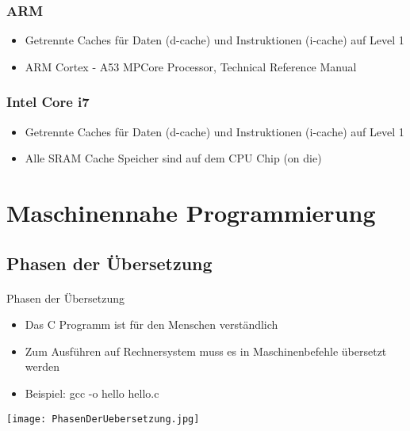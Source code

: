 			\vspace{1cm}
			\begin{minipage}[t]{0.5\textwidth}
				\subsubsection{ARM}
				\begin{itemize}
					\item Getrennte Caches für Daten (d-cache) und Instruktionen (i-cache) auf Level 1
					\item ARM Cortex - A53 MPCore Processor, Technical Reference Manual
				\end{itemize}
			\end{minipage}
			\begin{minipage}[t]{0.45\textwidth}
				\subsubsection{Intel Core i7}
				\begin{itemize}
					\item Getrennte Caches für Daten (d-cache) und Instruktionen (i-cache) auf Level 1
					\item Alle SRAM Cache Speicher sind auf dem CPU Chip (on die)
				\end{itemize}
			\end{minipage}


\newpage
\section{Maschinennahe Programmierung}
	\subsection{Phasen der Übersetzung}
		\paragraph{} Phasen der Übersetzung
		\begin{itemize}
			\item Das C Programm ist für den Menschen verständlich
			\item Zum Ausführen auf Rechnersystem muss es in Maschinenbefehle übersetzt werden
			\item Beispiel: gcc -o hello hello.c
		\end{itemize}

		\begin{center}
			\texttt{[image: PhasenDerUebersetzung.jpg]}
		\end{center}

